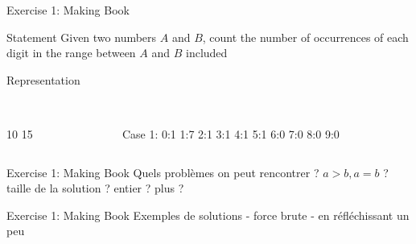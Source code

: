 \documentclass{beamer}
\begin{document}
\begin{frame}{Exercise 1: Making Book}
  \begin{block}{Statement}
    Given two numbers $A$ and $B$, count the number of occurrences of each digit in the range between $A$ and $B$ included
  \end{block}
  
  \pause
  \begin{block}{Representation}
    \centering
  \end{block}
  
  \pause
  \begin{example}
    \begin{columns}[T]
      \begin{column}{0.17\linewidth}
        \\
        10 15\\
      \end{column}
      \begin{column}{0.79\linewidth}
        \\
        Case 1: 0:1 1:7 2:1 3:1 4:1 5:1 6:0 7:0 8:0 9:0\\
      \end{column}
    \end{columns}
  \end{example}
\end{frame}

\begin{frame}{Exercise 1: Making Book}
  Quels problèmes on peut rencontrer ?
  $a > b, a = b$ ?
  taille de la solution ? entier ? plus ?
\end{frame}

\begin{frame}{Exercise 1: Making Book}
  Exemples de solutions
    - force brute
    - en réfléchissant un peu
\end{frame}
\end{document}
